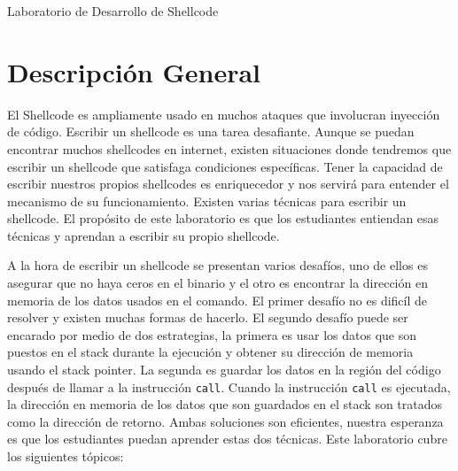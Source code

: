 
\newcommand{\commonfolder}{../../common-files}










\begin{center}
{\LARGE Laboratorio de Desarrollo de Shellcode}
\end{center}




\section{Descripción General}

El Shellcode es ampliamente usado en muchos ataques que involucran inyección de código. Escribir un shellcode es una tarea desafiante. Aunque se puedan encontrar muchos shellcodes en internet, existen situaciones donde tendremos que escribir un shellcode que satisfaga condiciones específicas. Tener la capacidad de escribir nuestros propios shellcodes es enriquecedor y nos servirá para entender el mecanismo de su funcionamiento.
Existen varias técnicas para escribir un shellcode.
El propósito de este laboratorio es que los estudiantes entiendan esas técnicas y aprendan a escribir su propio shellcode.

A la hora de escribir un shellcode se presentan varios desafíos, uno de ellos es asegurar que no haya ceros en el binario y el otro es encontrar la dirección en memoria de los datos usados en el comando.
El primer desafío no es dificíl de resolver y existen muchas formas de hacerlo.
El segundo desafío puede ser encarado por medio de dos estrategias, la primera es usar los datos que son puestos en el stack durante la ejecución y obtener su dirección de memoria usando el stack pointer. La segunda es guardar los datos en la región del código después de llamar a la instrucción \texttt{call}.
Cuando la instrucción \texttt{call} es ejecutada, la dirección en memoria de los datos que son guardados en el stack son tratados como la dirección de retorno.
Ambas soluciones son eficientes, nuestra esperanza es que los estudiantes puedan aprender estas dos técnicas.
Este laboratorio cubre los siguientes tópicos:


